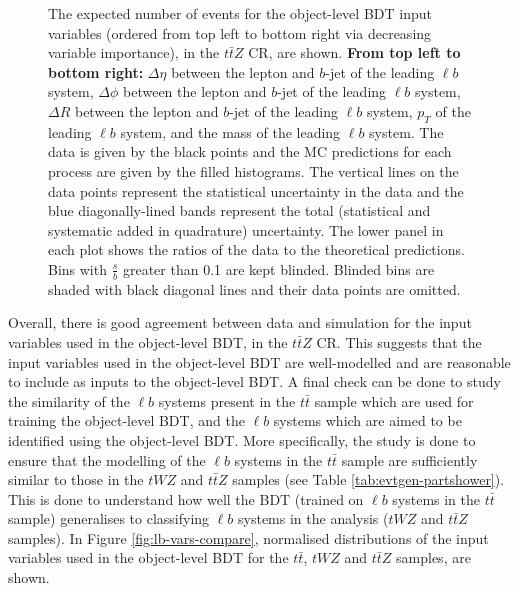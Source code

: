 \begin{figure}[htbp]
\caption{The expected number of events for the object-level BDT input variables (ordered from top left to bottom right via decreasing variable importance), in the $t\bar{t}Z$ CR, are shown. \textbf{From top left to bottom right:} $\Delta \eta$ between the lepton and $b$-jet of the leading $\ell b$ system, $\Delta \phi$ between the lepton and $b$-jet of the leading $\ell b$ system, $\Delta R$ between the lepton and $b$-jet of the leading $\ell b$ system, $p_{T}$ of the leading $\ell b$ system, and the mass of the leading $\ell b$ system. The data is given by the black points and the MC predictions for each process are given by the filled histograms. The vertical lines on the data points represent the statistical uncertainty in the data and the blue diagonally-lined bands represent the total (statistical and systematic added in quadrature) uncertainty. The lower panel in each plot shows the ratios of the data to the theoretical predictions. Bins with $\frac{s}{b}$ greater than 0.1 are kept blinded. Blinded bins are shaded with black diagonal lines and their data points are omitted. }
  \label{fig:4lep-ttZCR-objectbdt-vars}
\end{figure}Overall, there is good agreement between data and simulation for the input variables used in the object-level BDT, in the $t\bar{t}Z$ CR. This suggests that the input variables used in the object-level BDT are well-modelled and are reasonable to include as inputs to the object-level BDT. A final check can be done to study the similarity of the $\ell b$ systems present in the $t\bar{t}$ sample which are used for training the object-level BDT, and the $\ell b$ systems which are aimed to be identified using the object-level BDT. More specifically, the study is done to ensure that the modelling of the $\ell b$ systems in the $t\bar{t}$ sample are sufficiently similar to those in the $tWZ$ and $t\bar{t}Z$ samples (see Table \ref{tab:evtgen-partshower}). This is done to understand how well the BDT (trained on $\ell b$ systems in the $t\bar{t}$ sample) generalises to classifying $\ell b$ systems in the analysis ($tWZ$ and $t\bar{t}Z$ samples). In Figure \ref{fig:lb-vars-compare}, normalised distributions of the input variables used in the object-level BDT for the $t\bar{t}$, $tWZ$ and $t\bar{t}Z$ samples, are shown.
